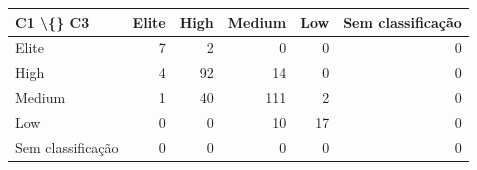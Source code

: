 \begin{tabular}{lrrrrr}
\hline
C1 \textbackslash\{\} C3 & Elite & High & Medium & Low & Sem classificação \\
\hline
Elite & 7 & 2 & 0 & 0 & 0 \\
High & 4 & 92 & 14 & 0 & 0 \\
Medium & 1 & 40 & 111 & 2 & 0 \\
Low & 0 & 0 & 10 & 17 & 0 \\
Sem classificação & 0 & 0 & 0 & 0 & 0 \\
\hline
\end{tabular}
